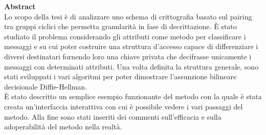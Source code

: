 


\vspace*{\fill}
\begin{center}

\begin{minipage}{0.9\textwidth}
\textbf{Abstract}\\
Lo scopo della tesi è di analizzare uno schema di crittografia basato sul pairing tra gruppi ciclici che permetta granularità in fase di decrittazione. È stato studiato il problema considerando gli attributi come metodo per classificare i messaggi e su cui poter costruire una struttura d'accesso capace di differenziare i diversi destinatari fornendo loro una chiave privata che decifrasse unicamente i messaggi con determinati attributi. Una volta definita la struttura generale, sono stati sviluppati i vari algoritmi per poter dimostrare l'assunzione bilineare decisionale Diffie-Hellman.\\
È stato descritto un semplice esempio funzionante del metodo con la quale è stata creata un'interfaccia interattiva con cui è possibile vedere i vari passaggi del metodo. Alla fine sono stati inseriti dei commenti sull'efficacia e sulla adoperabilità del metodo nella realtà.
\end{minipage}

\end{center}
\vfill %